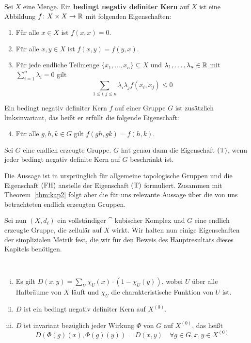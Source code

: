 \begin{definition}
\label{def_cnk}
	Sei $X$ eine Menge. Ein \textbf{bedingt negativ definiter Kern} auf $X$ ist eine Abbildung $f \colon X \times X \rightarrow \mathbb{R}$ mit folgenden Eigenschaften:
	\begin{enumerate}[(1)]
		\item Für alle $x \in X$ ist $f(x,x) = 0$.
		\item Für alle $x,y \in X$ ist $f(x,y) = f(y,x)$.
		\item Für jede endliche Teilmenge $\{x_1,\dots,x_n\} \subseteq X$ und $\lambda_1, \dots, \lambda_n \in \mathbb{R}$ mit $\sum_{i=1}^{n} \lambda_i = 0$ gilt
		\[ \sum_{1 \leq i,j \leq n} \lambda_i \lambda_j f(x_i,x_j) \leq 0\]
	\end{enumerate}
	Ein bedingt negativ definiter Kern $f$ auf einer Gruppe $G$ ist zusätzlich linksinvariant, das heißt er erfüllt die folgende Eigenschaft:
	\begin{enumerate}[(1)] \setcounter{enumi}{3}
		\item Für alle $g,h,k \in G$ gilt $f(gh,gk) = f(h,k)$.
	\end{enumerate}
\end{definition}

\begin{satz}
	Sei $G$ eine endlich erzeugte Gruppe. $G$ hat genau dann die Eigenschaft $\operatorname{(T)}$, wenn jeder bedingt negativ definite Kern auf $G$ beschränkt ist.
\end{satz}

Die Aussage ist in \cite{BekkaHarpeValette} ursprünglich für allgemeine topologische Gruppen und die Eigenschaft $\operatorname{(FH)}$ anstelle der Eigenschaft $\operatorname{(T)}$ formuliert. Zusammen mit Theorem~\ref{thm:kap2} folgt aber die für uns relevante Aussage über die von uns betrachteten endlich erzeugten Gruppen.

Sei nun $(X,d_\ell)$ ein vollständiger $\cat$ kubischer Komplex und $G$ eine endlich erzeugte Gruppe, die zellulär auf $X$ wirkt. Wir halten nun einige Eigenschaften der simplizialen Metrik fest, die wir für den Beweis des Hauptresultats dieses Kapitels benötigen.

\begin{lemma}
	\label{lemma_simp_metr} \mbox{} \\[-1.4cm]
	\begin{enumerate}[(i)]
		\item Es gilt $D(x,y) = \sum\limits_{U} \chi_U(x) \cdot (1 - \chi_U(y))$, wobei $U$ über alle Halbräume von $X$ läuft und $\chi_U$ die charakteristische Funktion von $U$ ist.
		\item $D$ ist ein bedingt negativ definiter Kern auf $X^{(0)}$.
		\item $D$ ist invariant bezüglich jeder Wirkung $\Phi$ von $G$ auf $X^{(0)}$, das heißt
		\[D(\Phi(g)(x),\Phi(g)(y)) = D(x,y) \quad \forall g \in G, x,y \in X^{(0)} \]
	\end{enumerate}
\end{lemma}

